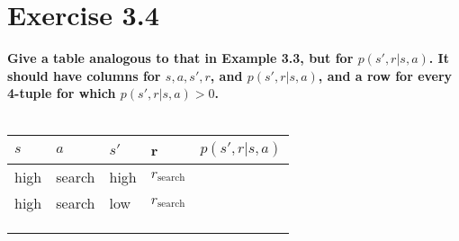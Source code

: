 \documentclass[a4paper,11pt]{article}
\numberwithin{equation}{section}
\theoremstyle{remark}
\begin{document}
\section{Exercise 3.4}
\textbf{
Give a table analogous to that in Example 3.3, but for $p(s',r| s,a)$. It
should have columns for $s, a, s', r$, and $p(s', r | s, a)$, and a row for every 4-tuple for which
$p(s',r| s,a) > 0$. 
}
\\ \\
\begin{center}
\begin{tabular}{llll|l}
$s$ & $a$ & $s'$ & r & $p(s' ,r|s,a)$ \\ \hline
 high   &  search   &  high    & $r_{\text{search}}$  &                \\
  high  &    search &  low    &  $r_{\text{search}}$ &                \\
    &     &      &   &                \\
    &     &      &   &                \\
    &     &      &   &               
\end{tabular}
\end{center}
\end{document}
